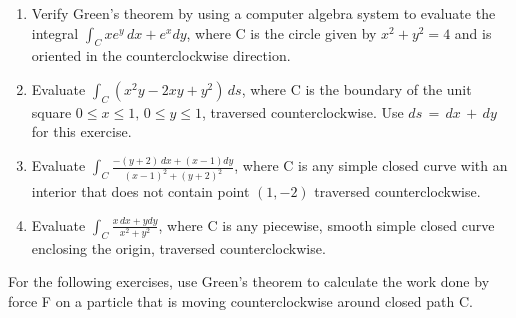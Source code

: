 \documentclass{exercises}
\begin{document}
\begin{enumerate}[resume]
\item \techrequired Verify Green's theorem by using a computer algebra system to evaluate the integral $\int_{C}xe^{y}\,dx+e^{x}dy$, where C is the circle given by $x^{2}+y^{2}=4$ and is oriented in the counterclockwise direction.
\item Evaluate $\int_{C}(x^{2}y-2xy+y^{2})\,ds$, where C is the boundary of the unit square $0\le x\le1,\,0\le y\le1$, traversed counterclockwise. Use $ds\,=\,dx\,+\,dy$ for this exercise.
\item Evaluate $\int_{C}^{}\frac{-(y+2)\,dx+(x-1)dy}{{(x-1)}^{2}+{(y+2)}^{2}}$, where C is any simple closed curve with an interior that does not contain point $(1,-2)$ traversed counterclockwise.
\item Evaluate $\int_{C}^{}\frac{x\,dx+ydy}{x^{2}+y^{2}}$, where C is any piecewise, smooth simple closed curve enclosing the origin, traversed counterclockwise.
\end{enumerate}

For the following exercises, use Green's theorem to calculate the work done by force F on a particle that is moving counterclockwise around closed path C.
\end{document}

